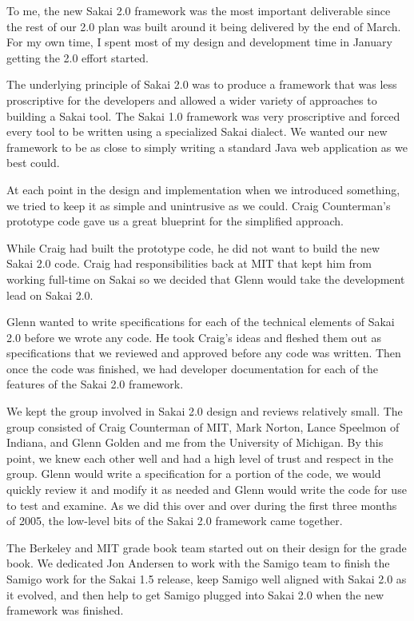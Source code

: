 \documentclass[12pt]{book}
\begin{document}
To me, the new Sakai 2.0 framework was the most important
deliverable since the rest of our 2.0 plan was built
around it being delivered by the end of March.
For my own time, I spent most of my design and
development time in January getting the 2.0 effort
started.

The underlying principle of Sakai 2.0 was to produce a
framework that was less proscriptive for the developers
and allowed a wider variety of approaches to building
a Sakai tool. The Sakai 1.0 framework was very proscriptive
and forced every tool to be written using a specialized
Sakai dialect.  We wanted our new framework to be
as close to simply writing a standard Java web application
as we best could.

At each point in the design and implementation when we
introduced something, we tried to keep it as simple and
unintrusive as we could.  Craig Counterman's prototype
code gave us a great blueprint for the simplified approach.

While Craig had built the prototype code, he did not want
to build the new Sakai 2.0 code.  Craig had responsibilities
back at MIT that kept him from working full-time on Sakai
so we decided that Glenn would take the development
lead on Sakai 2.0.

Glenn wanted to write specifications for each of
the technical elements of Sakai 2.0 before we wrote
any code.  He took Craig's ideas and fleshed them out
as specifications that we reviewed and approved
before any code was written.
Then once the code was finished, we had developer
documentation for each of the features of the Sakai 2.0
framework.

We kept the group involved in Sakai 2.0 design and reviews
relatively small.  The group consisted of Craig Counterman
of MIT, Mark Norton, Lance Speelmon of Indiana, and
Glenn Golden and me from the University of Michigan.  By this
point, we knew each other well and had a high level of trust
and respect in the group.  Glenn would write a specification for
a portion of the code, we would quickly review it and modify
it as needed and Glenn would write the code for use to
test and examine.  As we did this over and over during the
first three months of 2005, the low-level
bits of the Sakai 2.0 framework came together.

The Berkeley and MIT grade book team started out on their
design for the grade book.  We dedicated Jon
Andersen to work with the Samigo team to finish the
Samigo work for the Sakai 1.5 release, keep
Samigo well aligned with Sakai 2.0 as it evolved,
and then help to get Samigo plugged into Sakai 2.0
when the new framework was finished.
\end{document}
